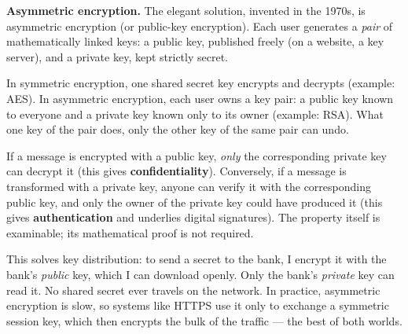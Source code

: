 \documentclass[11pt]{article}
\newcommand{\cle}[1]{{\popxbold\color{popdark}#1}}
\begin{document}
\textbf{Asymmetric encryption.} The elegant solution, invented in the 1970s, is \cle{asymmetric encryption} (or public-key encryption). Each user generates a \emph{pair} of mathematically linked keys: a \cle{public key}, published freely (on a website, a key server), and a \cle{private key}, kept strictly secret.

\begin{definition}
In \cle{symmetric encryption}, one shared secret key encrypts and decrypts (example: AES). In \cle{asymmetric encryption}, each user owns a key pair: a \cle{public key} known to everyone and a \cle{private key} known only to its owner (example: RSA). What one key of the pair does, only the other key of the same pair can undo.
\end{definition}

\begin{propriete}
If a message is encrypted with a public key, \emph{only} the corresponding private key can decrypt it (this gives \textbf{confidentiality}). Conversely, if a message is transformed with a private key, anyone can verify it with the corresponding public key, and only the owner of the private key could have produced it (this gives \textbf{authentication} and underlies digital signatures). The property itself is examinable; its mathematical proof is not required.
\end{propriete}

This solves key distribution: to send a secret to the bank, I encrypt it with the bank's \emph{public} key, which I can download openly. Only the bank's \emph{private} key can read it. No shared secret ever travels on the network. In practice, asymmetric encryption is slow, so systems like HTTPS use it only to exchange a symmetric session key, which then encrypts the bulk of the traffic --- the best of both worlds.
\end{document}
